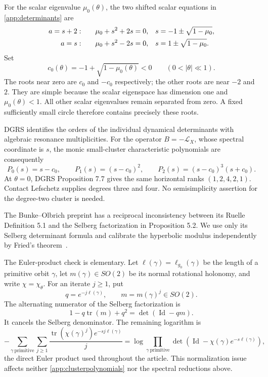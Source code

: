 \documentclass[11pt,letterpaper,reqno]{amsart}
\theoremstyle{remark}
\newcommand{\Id}{\operatorname{Id}}
\begin{document}
For the scalar eigenvalue $\mu_0(\theta)$, the two shifted scalar
equations in \eqref{app:determinants} are
\begin{align}\label{app:scalarroots}
 a=s+2:&\qquad
  \mu_0+s^2+2s=0,
  &&s=-1\pm\sqrt{1-\mu_0},\notag\\
 a=s:&\qquad
  \mu_0+s^2-2s=0,
  &&s=1\pm\sqrt{1-\mu_0}.
\end{align}
Set
\begin{equation}\label{app:c0}
 c_0(\theta)=-1+\sqrt{1-\mu_0(\theta)}<0
 \qquad(0<|\theta|\ll1).
\end{equation}
The roots near zero are $c_0$ and $-c_0$ respectively; the other
roots are near $-2$ and $2$. They are simple because the scalar
eigenspace has dimension one and $\mu_0(\theta)<1$. All other
scalar eigenvalues remain separated from zero. A fixed sufficiently
small circle therefore contains precisely these roots.

DGRS identifies the orders of the individual dynamical determinants
with algebraic resonance multiplicities. For the operator
$B=-\mathcal L_X$, whose spectral coordinate is $s$, the monic
small-cluster characteristic polynomials are consequently
\begin{equation}\label{app:clusterpolynomials}
 P_0(s)=s-c_0,
 \qquad P_1(s)=(s-c_0)^2,
 \qquad P_2(s)=(s-c_0)^3(s+c_0).
\end{equation}
At $\theta=0$, DGRS Proposition 7.7 gives the same horizontal ranks
$(1,2,4,2,1)$. Contact Lefschetz supplies degrees three and four.
No semisimplicity assertion for the degree-two cluster is needed.



The Bunke--Olbrich preprint has a reciprocal inconsistency between
its Ruelle Definition 5.1 and the Selberg factorization in Proposition
5.2. We use only its Selberg determinant formula and calibrate the
hyperbolic modulus independently by Fried's theorem~\cite{Fried}.

The Euler-product check is elementary. Let $\ell(\gamma)=\ell_{g_0}(\gamma)$
be the length of a primitive orbit $\gamma$, let $m(\gamma)\in SO(2)$
be its normal rotational holonomy, and write $\chi=\chi_\theta$.
For an iterate $j\geq1$, put
\begin{equation}\label{app:BOq}
 q=e^{-j\ell(\gamma)},\qquad m=m(\gamma)^j\in SO(2).
\end{equation}
The alternating numerator of the Selberg factorization is
\begin{equation}\label{app:BOcancellation}
 1-q\operatorname{tr}(m)+q^2=\det(\Id-qm).
\end{equation}
It cancels the Selberg denominator. The remaining logarithm is
\begin{equation}\label{app:BOdirectlog}
 -\sum_{\gamma\ \mathrm{primitive}}\sum_{j\geq1}
 \frac{\operatorname{tr}(\chi(\gamma)^j)e^{-sj\ell(\gamma)}}{j}
 =\log\prod_{\gamma\ \mathrm{primitive}}
       \det(\Id-\chi(\gamma)e^{-s\ell(\gamma)}),
\end{equation}
the direct Euler product used throughout the article. This
normalization issue affects neither \eqref{app:clusterpolynomials}
nor the spectral reductions above.
\end{document}

